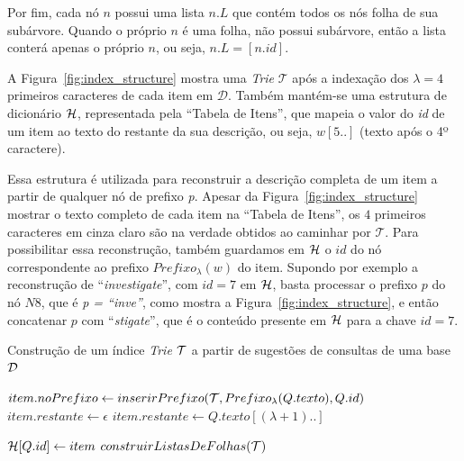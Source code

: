 Por fim, cada nó $n$ possui uma lista $n.L$ que contém todos os nós folha de sua subárvore. Quando o próprio $n$ é uma folha, não possui subárvore, então a lista conterá apenas o próprio $n$, ou seja, $n.L = [n.id]$.

A Figura~\ref{fig:index_structure} mostra uma \textit{Trie} $\mathcal{T}$ após a indexação dos $\lambda = 4$ primeiros caracteres de cada item em $\mathcal{D}$. Também mantém-se uma estrutura de dicionário $\mathcal{H}$, representada pela ``Tabela de Itens'', que mapeia o valor do \textit{id} de um item ao texto do restante da sua descrição, ou seja, $w[5..]$ (texto após o 4º caractere).

Essa estrutura é utilizada para reconstruir a descrição completa de um item a partir de qualquer nó de prefixo \textit{p}. Apesar da Figura~\ref{fig:index_structure} mostrar o texto completo de cada item na ``Tabela de Itens'', os $4$ primeiros caracteres em cinza claro são na verdade obtidos ao caminhar por $\mathcal{T}$. Para possibilitar essa reconstrução, também guardamos em $\mathcal{H}$ o $id$ do nó correspondente ao prefixo $Prefixo_{\lambda}(w)$ do item. Supondo por exemplo a reconstrução de ``\textit{investigate}'', com $id=7$ em $\mathcal{H}$, basta processar o prefixo $p$ do nó $N8$, que é \textit{p = ``inve''}, como mostra a Figura~\ref{fig:index_structure}, e então concatenar $p$ com ``\textit{stigate}'', que é o conteúdo presente em $\mathcal{H}$ para a chave $id=7$.

\begin{algorithm}[ht]
\caption{Construção de um índice \textit{Trie} $\mathcal{T}$ a partir de sugestões de consultas de uma base $\mathcal{D}$}\label{alg:dataset_indexing}
\begin{algorithmic}[1]
        \State $item.noPrefixo \leftarrow inserirPrefixo(\mathcal{T}, Prefixo_{\lambda}(Q.texto), Q.id)$
            \State $item.restante \leftarrow \epsilon$
         \Else{}
            \State $item.restante \leftarrow Q.texto[(\lambda + 1)..]$
         \EndIf
         
         \State $\mathcal{H}[Q.id] \leftarrow item$
    \EndFor
    \State $construirListasDeFolhas(\mathcal{T})$
\EndFunction
\end{algorithmic}
\end{algorithm}

